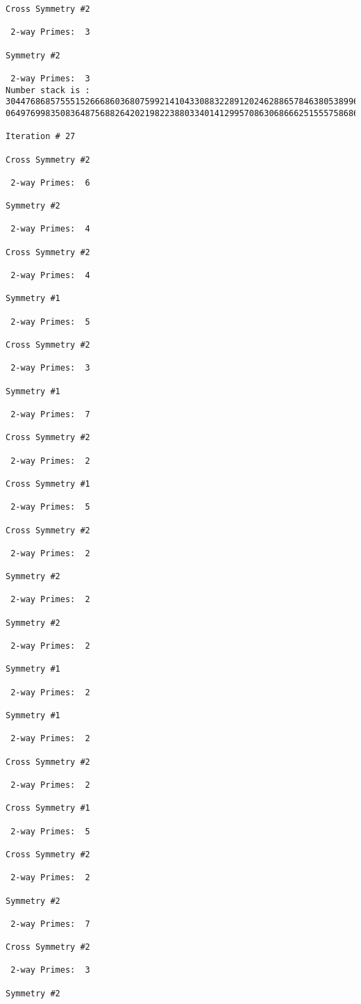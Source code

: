 \begin{verbatim}
Cross Symmetry #2

 2-way Primes: 	3

Symmetry #2

 2-way Primes: 	3
Number stack is :
30447686857555152666860368075992141043308832289120246288657846380538996794608835958544046240163340857
06497699835083648756882642021982238803340141299570863068666251555758686744037580433610426404458595388

Iteration #	27

Cross Symmetry #2

 2-way Primes: 	6

Symmetry #2

 2-way Primes: 	4

Cross Symmetry #2

 2-way Primes: 	4

Symmetry #1

 2-way Primes: 	5

Cross Symmetry #2

 2-way Primes: 	3

Symmetry #1

 2-way Primes: 	7

Cross Symmetry #2

 2-way Primes: 	2

Cross Symmetry #1

 2-way Primes: 	5

Cross Symmetry #2

 2-way Primes: 	2

Symmetry #2

 2-way Primes: 	2

Symmetry #2

 2-way Primes: 	2

Symmetry #1

 2-way Primes: 	2

Symmetry #1

 2-way Primes: 	2

Cross Symmetry #2

 2-way Primes: 	2

Cross Symmetry #1

 2-way Primes: 	5

Cross Symmetry #2

 2-way Primes: 	2

Symmetry #2

 2-way Primes: 	7

Cross Symmetry #2

 2-way Primes: 	3

Symmetry #2


\end{verbatim}
